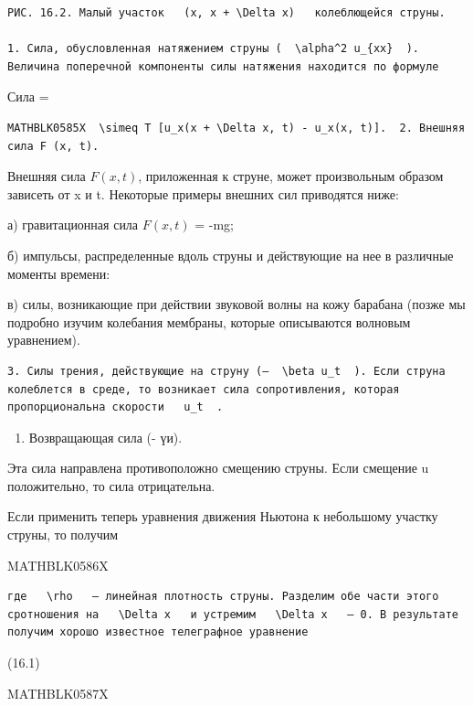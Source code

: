 \documentclass[
]{article}
\providecommand{\tightlist}{%
  \setlength{\itemsep}{0pt}\setlength{\parskip}{0pt}}
\begin{document}
\begin{verbatim}
РИС. 16.2. Малый участок   (x, x + \Delta x)   колеблющейся струны.

1. Сила, обусловленная натяжением струны (  \alpha^2 u_{xx}  ). Величина поперечной компоненты силы натяжения находится по формуле
\end{verbatim}

Сила =

\begin{verbatim}
MATHBLK0585X  \simeq T [u_x(x + \Delta x, t) - u_x(x, t)].  2. Внешняя сила F (x, t).
\end{verbatim}

Внешняя сила \(F(x, t)\), приложенная к струне, может произвольным
образом зависеть от x и t. Некоторые примеры внешних сил приводятся
ниже:

а) гравитационная сила \(F(x, t)\) = -mg;

б) импульсы, распределенные вдоль струны и действующие на нее в
различные моменты времени:

в) силы, возникающие при действии звуковой волны на кожу барабана (позже
мы подробно изучим колебания мембраны, которые описываются волновым
уравнением).

\begin{verbatim}
3. Силы трения, действующие на струну (—  \beta u_t  ). Если струна колеблется в среде, то возникает сила сопротивления, которая пропорциональна скорости   u_t  .
\end{verbatim}

\begin{enumerate}
\def\labelenumi{\arabic{enumi}.}
\setcounter{enumi}{3}
\tightlist
\item
  Возвращающая сила (- үи).
\end{enumerate}

Эта сила направлена противоположно смещению струны. Если смещение u
положительно, то сила отрицательна.

Если применить теперь уравнения движения Ньютона к небольшому участку
струны, то получим

MATHBLK0586X

\begin{verbatim}
где   \rho   — линейная плотность струны. Разделим обе части этого сротношения на   \Delta x   и устремим   \Delta x   — 0. В результате получим хорошо известное телеграфное уравнение
\end{verbatim}

(16.1)

MATHBLK0587X
\end{document}
